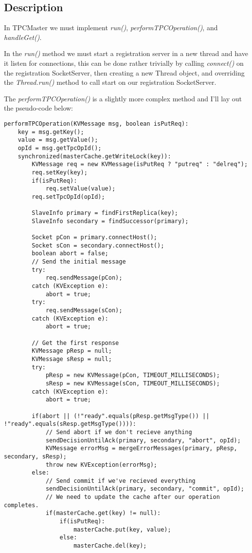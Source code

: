 \documentclass{article}
\begin{document}
\subsection*{Description}

In TPCMaster we must implement \textit{run()}, \textit{performTPCOperation()}, and \textit{handleGet()}.

In the \textit{run()} method we must start a registration server in a new thread and have it listen for connections,
this can be done rather trivially by calling \textit{connect()} on the registration SocketServer, then creating a
new Thread object, and overriding the \textit{Thread.run()} method to call start on our registration SocketServer.

The \textit{performTPCOperation()} is a slightly more complex method and I'll lay out the pseudo-code below:
\begin{verbatim}
performTPCOperation(KVMessage msg, boolean isPutReq):
    key = msg.getKey();
    value = msg.getValue();
    opId = msg.getTpcOpId();
    synchronized(masterCache.getWriteLock(key)):
        KVMessage req = new KVMessage(isPutReq ? "putreq" : "delreq");
        req.setKey(key);
        if(isPutReq):
            req.setValue(value);
        req.setTpcOpId(opId);

        SlaveInfo primary = findFirstReplica(key);
        SlaveInfo secondary = findSuccessor(primary);

        Socket pCon = primary.connectHost();
        Socket sCon = secondary.connectHost();
        boolean abort = false;
        // Send the initial message
        try:
            req.sendMessage(pCon);
        catch (KVException e):
            abort = true;
        try:
            req.sendMessage(sCon);
        catch (KVException e):
            abort = true;

        // Get the first response
        KVMessage pResp = null;
        KVMessage sResp = null;
        try:
            pResp = new KVMessage(pCon, TIMEOUT_MILLISECONDS);
            sResp = new KVMessage(sCon, TIMEOUT_MILLISECONDS);
        catch (KVException e):
            abort = true;

        if(abort || (!"ready".equals(pResp.getMsgType()) || !"ready".equals(sResp.getMsgType()))):
            // Send abort if we don't recieve anything
            sendDecisionUntilAck(primary, secondary, "abort", opId);
            KVMessage errorMsg = mergeErrorMessages(primary, pResp, secondary, sResp);
            throw new KVException(errorMsg);
        else:
            // Send commit if we've recieved everything
            sendDecisionUntilAck(primary, secondary, "commit", opId);
            // We need to update the cache after our operation completes.
            if(masterCache.get(key) != null):
                if(isPutReq):
                    masterCache.put(key, value);
                else:
                    masterCache.del(key);
\end{verbatim}
\end{document}

